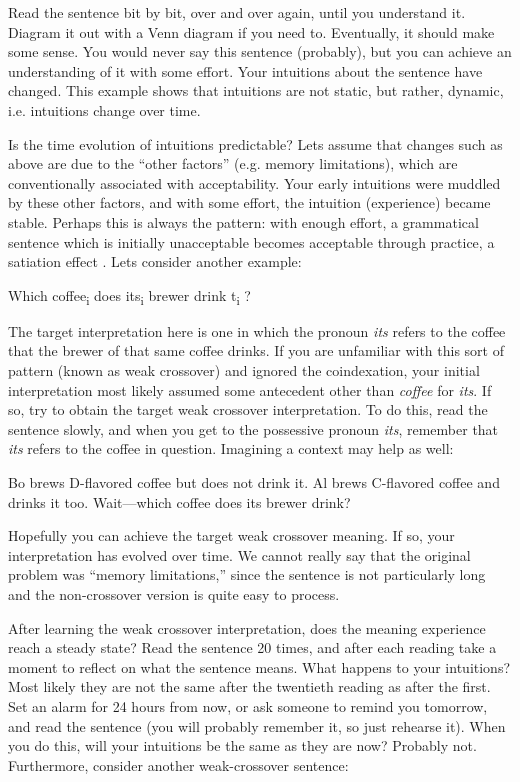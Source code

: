   Read the sentence bit by bit, over and over again, until you understand it. Diagram it out with a Venn diagram if you need to. Eventually, it should make some sense. You would never say this sentence (probably), but you can achieve an understanding of it with some effort. Your intuitions about the sentence have changed. This example shows that intuitions are not static, but rather, dynamic, i.e. intuitions change over time.

  Is the time evolution of intuitions predictable? Lets assume that changes such as above are due to the “other factors” (e.g. memory limitations), which are conventionally associated with acceptability. Your early intuitions were muddled by these other factors, and with some effort, the intuition (experience) became stable. Perhaps this is always the pattern: with enough effort, a grammatical sentence which is initially unacceptable becomes acceptable through practice, a satiation effect \citep{Snyder2000}. Lets consider another example:

\ea
Which coffee\textsubscript{i} does its\textsubscript{i} brewer drink t\textsubscript{i}
\z?

  The target interpretation here is one in which the pronoun \textit{its} refers to the coffee that the brewer of that same coffee drinks. If you are unfamiliar with this sort of pattern (known as weak crossover) and ignored the coindexation, your initial interpretation most likely assumed some antecedent other than \textit{coffee} for \textit{its}. If so, try to obtain the target weak crossover interpretation. To do this, read the sentence slowly, and when you get to the possessive pronoun \textit{its}, remember that \textit{its} refers to the coffee in question. Imagining a context may help as well:

\ea
\begin{exe}
  {Bo brews D-flavored coffee but does not drink it. Al brews C-flavored coffee and drinks it too.} 
  {Wait—which coffee does its brewer drink?}
\end{exe}
\z

  Hopefully you can achieve the target weak crossover meaning. If so, your interpretation has evolved over time. We cannot really say that the original problem was “memory limitations,” since the sentence is not particularly long and the non-crossover version is quite easy to process. 

  After learning the weak crossover interpretation, does the meaning experience reach a steady state? Read the sentence 20 times, and after each reading take a moment to reflect on what the sentence means. What happens to your intuitions? Most likely they are not the same after the twentieth reading as after the first. Set an alarm for 24 hours from now, or ask someone to remind you tomorrow, and read the sentence (you will probably remember it, so just rehearse it). When you do this, will your intuitions be the same as they are now? Probably not. Furthermore, consider another weak-crossover sentence: 


